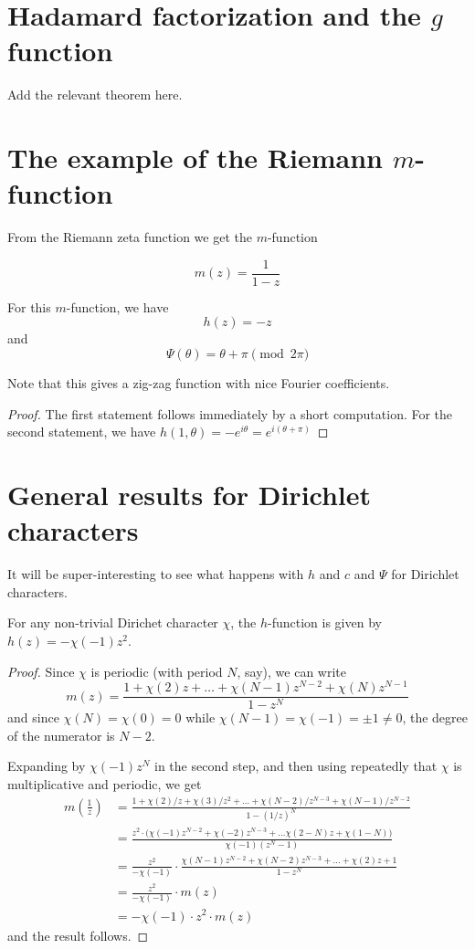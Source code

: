 \documentclass[a4paper]{amsart}
\begin{document}
\section{Hadamard factorization and the $g$ function}

Add the relevant theorem here.

\section{The example of the Riemann $m$-function}

From the Riemann zeta function we get the $m$-function

$$ m(z) = \frac{1}{1-z}   $$

\begin{lemma}
For this $m$-function, we have
$$h(z) = -z$$
and
$$\Psi(\theta ) = \theta + \pi \pmod {2\pi}$$

\end{lemma}
Note that this gives a zig-zag function with nice Fourier coefficients.

\begin{proof}
The first statement follows immediately by a short computation. For the second statement, we have $h(1, \theta) = -e^{i \theta} = e^{i (\theta + \pi)} $
\end{proof}

\section{General results for Dirichlet characters}

It will be super-interesting to see what happens with $h$ and $c$ and $\Psi$ for Dirichlet characters.

\begin{proposition}
For any non-trivial Dirichet character $\chi$, the $h$-function is given by $h(z) = -\chi(-1) z^2$.
\end{proposition}
\begin{proof}
Since $\chi$ is periodic (with period $N$, say), we can write
$$ m(z) = \frac{1 + \chi(2) z + \ldots + \chi(N-1) z^{N-2} + \chi(N) z^{N-1}}{1-z^N} $$
and since $\chi(N) = \chi(0) = 0$ while $\chi(N-1)= \chi(-1) = \pm 1 \neq 0$, the degree of the numerator is $N-2$.

Expanding by $\chi(-1) z^N $ in the second step, and then using repeatedly that $\chi$ is multiplicative and periodic, we get
\begin{align*}
    m(\frac{1}{z}) &= \frac{1+\chi(2)/z + \chi(3) / z^2 + \ldots + \chi(N-2) / z^{N-3} + \chi(N-1) /z^{N-2} }{1-(1/z)^N}  \\
        &= \frac{z^2 \cdot \big( \chi(-1)z^{N-2} + \chi(-2) z^{N-3} + \ldots \chi(2-N) z + \chi(1-N) \big)}{\chi(-1) (z^N - 1 )} \\
        &= \frac{z^2}{- \chi(-1)} \cdot \frac{ \chi(N-1) z^{N-2} + \chi(N-2) z^{N-3} + \ldots + \chi(2) z + 1}{1-z^N} \\
        &= \frac{z^2}{-\chi(-1)} \cdot m(z) \\
        &= -\chi(-1) \cdot z^2 \cdot m(z)
\end{align*}
and the result follows.
\end{proof}
\end{document}
